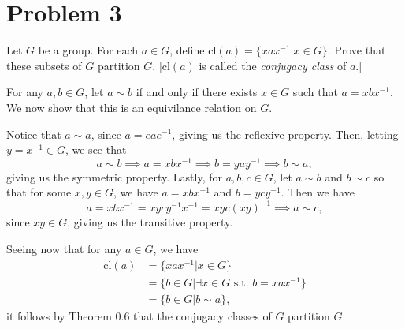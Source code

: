 \documentclass[12pt]{article}
\newcommand{\cl}{\mbox{cl}}
\begin{document}
\section*{Problem 3}

Let $G$ be a group.  For each $a\in G$, define $\cl(a)=\{xax^{-1}|x\in G\}$.
Prove that these subsets of $G$ partition $G$.  [$\cl(a)$ is called the {\it conjugacy
class} of $a$.]

For any $a,b\in G$, let $a\sim b$ if and only if there exists $x\in G$
such that $a=xbx^{-1}$.  We now show that this is an equivilance relation on $G$.

Notice that $a\sim a$, since $a=eae^{-1}$, giving us the reflexive property.
Then, letting $y=x^{-1}\in G$, we see that
\begin{equation*}
a\sim b\implies a=xbx^{-1}\implies b=yay^{-1}\implies b\sim a,
\end{equation*}
giving us the symmetric property.  Lastly, for $a,b,c\in G$,
let $a\sim b$ and $b\sim c$ so that for some $x,y\in G$, we have
$a=xbx^{-1}$ and $b=ycy^{-1}$.  Then we have
\begin{equation*}
a=xbx^{-1}=xycy^{-1}x^{-1}=xyc(xy)^{-1}\implies a\sim c,
\end{equation*}
since $xy\in G$, giving us the transitive property.

Seeing now that for any $a\in G$, we have
\begin{align*}
\cl(a)&=\{xax^{-1}|x\in G\}\\
 &= \{b\in G|\mbox{$\exists x\in G$ s.t. $b=xax^{-1}$}\}\\
 &= \{b\in G|b\sim a\},
\end{align*}
it follows by Theorem 0.6 that the conjugacy classes
of $G$ partition $G$.
\end{document}
